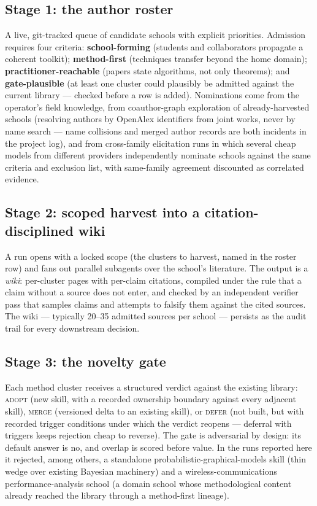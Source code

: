 \documentclass[11pt,a4paper]{article}
\begin{document}
\subsection{Stage 1: the author roster}

A live, git-tracked queue of candidate schools with explicit priorities.
Admission requires four criteria: \textbf{school-forming} (students and
collaborators propagate a coherent toolkit); \textbf{method-first}
(techniques transfer beyond the home domain); \textbf{practitioner-reachable}
(papers state algorithms, not only theorems); and \textbf{gate-plausible}
(at least one cluster could plausibly be admitted against the current
library --- checked before a row is added). Nominations come from the
operator's field knowledge, from coauthor-graph exploration of
already-harvested schools (resolving authors by OpenAlex identifiers from
joint works, never by name search --- name collisions and merged author
records are both incidents in the project log), and from cross-family
elicitation runs in which several cheap models from different providers
independently nominate schools against the same criteria and exclusion
list, with same-family agreement discounted as correlated evidence.

\subsection{Stage 2: scoped harvest into a citation-disciplined wiki}

A run opens with a locked scope (the clusters to harvest, named in the
roster row) and fans out parallel subagents over the school's literature.
The output is a \emph{wiki}: per-cluster pages with per-claim citations,
compiled under the rule that a claim without a source does not enter, and
checked by an independent verifier pass that samples claims and attempts to
falsify them against the cited sources. The wiki --- typically 20--35
admitted sources per school --- persists as the audit trail for every
downstream decision.

\subsection{Stage 3: the novelty gate}

Each method cluster receives a structured verdict against the existing
library: \textsc{adopt} (new skill, with a recorded ownership boundary
against every adjacent skill), \textsc{merge} (versioned delta to an
existing skill), or \textsc{defer} (not built, but with recorded trigger
conditions under which the verdict reopens --- deferral with triggers keeps
rejection cheap to reverse). The gate is adversarial by design: its default
answer is no, and overlap is scored before value. In the runs reported here
it rejected, among others, a standalone probabilistic-graphical-models
skill (thin wedge over existing Bayesian machinery) and a
wireless-communications performance-analysis school (a domain school whose
methodological content already reached the library through a method-first
lineage).
\end{document}
